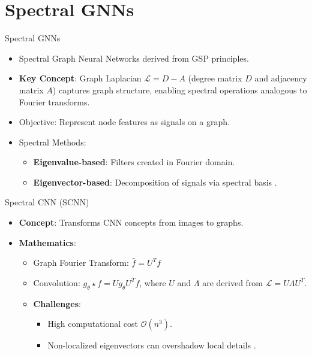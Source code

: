 \section{Spectral GNNs}

\begin{frame}{Spectral GNNs}
    \begin{itemize}
        \item Spectral Graph Neural Networks derived from GSP principles.
        \item \textbf{Key Concept}: Graph Laplacian $\mathcal{L} = D - A$ (degree matrix $D$ and adjacency matrix $A$) captures graph structure, enabling spectral operations analogous to Fourier transforms.
        \item Objective: Represent node features as signals on a graph.
        \item Spectral Methods:
        \begin{itemize}
            \item \textbf{Eigenvalue-based}: Filters created in Fourier domain.
            \item \textbf{Eigenvector-based}: Decomposition of signals via spectral basis \cite{bo2023surveyspectralgraphneural}.
        \end{itemize}
    \end{itemize}
\end{frame}

\begin{frame}{Spectral CNN (SCNN)}
    \begin{itemize}
        \item \textbf{Concept}: Transforms CNN concepts from images to graphs.
        \item \textbf{Mathematics}:
        \begin{itemize}
            \item Graph Fourier Transform: $\hat{f} = U^T f$
            \item Convolution: $g_{\theta} \star f = U g_{\theta} U^T f$, where $U$ and $\Lambda$ are derived from $\mathcal{L} = U \Lambda U^T$.
            \item \textbf{Challenges}:
            \begin{itemize}
                \item High computational cost $\mathcal{O}(n^3)$.
                \item Non-localized eigenvectors can overshadow local details \cite{bruna2013spectral}.
            \end{itemize}
        \end{itemize}
    \end{itemize}
\end{frame}

